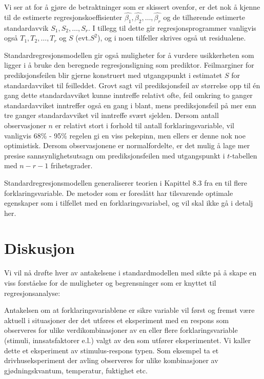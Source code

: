 Vi ser at for å gjøre de betraktninger som er skissert ovenfor, er det
nok å kjenne til de estimerte regresjonskoeffisienter $ \hat{{\beta}_1},
\hat{{\beta}_2},\ldots, \hat{{\beta}_r}$ og de tilhørende estimerte
standardavvik $S_1,S_2,\ldots,S_r$.  I tillegg til dette gir 
regresjonsprogrammer vanligvis også $T_1, T_2, \ldots, T_r $ og $S$
(evt.$S^2$), og i noen tilfeller skrives også ut residualene.

Standardregresjonsmodellen gir også muligheter for å vurdere 
usikkerheten som ligger i å bruke den beregnede regresjonsligning som
prediktor.  Feilmarginer for prediksjonsfeilen blir gjerne konstruert med
utgangspunkt i estimatet $S$ for standardavviket til feilleddet.  Grovt sagt
vil prediksjonsfeil av størrelse opp til \'{e}n gang dette standardavviket
kunne inntreffe relativt ofte, feil omkring to ganger standardavviket
inntreffer også en gang i blant, mens prediksjonsfeil på mer enn tre
ganger standardavviket vil inntreffe svært sjelden.  Dersom antall
observasjoner $n$ er relativt stort i forhold til antall forklaringsvariable,
vil vanligvis 68\% - 95\% regelen gi en viss pekepinn, men ellers er denne
nok noe optimistisk.  Dersom observasjonene er normalfordelte, er det mulig
å lage mer presise sannsynlighetsutsagn om prediksjonsfeilen med 
utgangspunkt i $t$-tabellen med $n-r-1$ frihetsgrader.

Standardregresjonsmodellen generaliserer teorien i Kapittel 8.3 fra en til
flere forklaringsvariable.  De metoder som er foreslått har tilsvarende
optimale egenskaper som i tilfellet med en forklaringsvariabel, og vil skal
ikke gå i detalj her.


\section {Diskusjon}
Vi vil nå drøfte hver av antakelsene i standardmodellen med sikte
på å skape en viss forståelse for de muligheter og
begrensninger som er knyttet til regresjonsanalyse:

Antakelsen om at forklaringsvariablene er sikre variable vil først og
fremst være aktuell i situasjoner der det utføres et eksperiment
med en respons som observeres for ulike verdikombinasjoner av en eller flere
for\-kla\-rings\-variable (stimuli, innsatsfaktorer e.l.) valgt av den som 
utfører eks\-peri\-men\-tet.  Vi kaller dette et eksperiment av 
stimulus-respons typen.  Som eksempel ta et drivhuseksperiment  der avling
observeres for ulike kombinasjoner av gjødningskvantum, temperatur, 
fuktighet etc.

